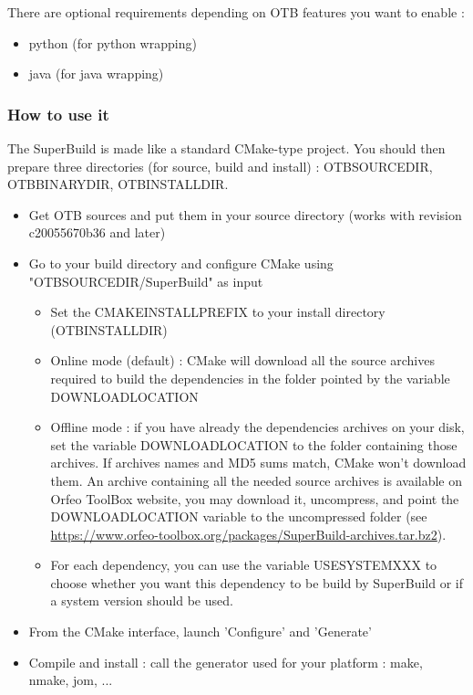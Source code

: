 There are optional requirements depending on OTB features you want to enable :
\begin{itemize}
	\item python (for python wrapping)
    \item java (for java wrapping) 
\end{itemize}

\subsubsection{How to use it}

The SuperBuild is made like a standard CMake-type project. You should then prepare three directories (for source, build and install) :
OTB\textunderscore SOURCE\textunderscore DIR, OTB\textunderscore BINARY\textunderscore DIR, OTB\textunderscore INSTALL\textunderscore DIR.

\begin{itemize}
	\item Get OTB sources and put them in your source directory (works with revision c20055670b36 and later)
    \item Go to your build directory and configure CMake using "OTB\textunderscore SOURCE\textunderscore DIR/SuperBuild" as input
    \begin{itemize}
        \item Set the CMAKE\textunderscore INSTALL\textunderscore PREFIX to your install directory (OTB\textunderscore INSTALL\textunderscore DIR)
        \item Online mode (default) : CMake will download all the source archives required to build the dependencies in the folder pointed by the variable DOWNLOAD\textunderscore LOCATION
        \item Offline mode : if you have already the dependencies archives on your disk, set the variable DOWNLOAD\textunderscore LOCATION to the folder containing those archives. If archives names and MD5 sums match, CMake won't download them. An archive containing all the needed source archives is available on Orfeo ToolBox website, you may download it, uncompress, and point the DOWNLOAD\textunderscore LOCATION variable to the uncompressed folder (see \url{https://www.orfeo-toolbox.org/packages/SuperBuild-archives.tar.bz2}).
        \item For each dependency, you can use the variable USE\textunderscore SYSTEM\textunderscore XXX to choose whether you want this dependency to be build by SuperBuild or if a system version should be used. 
    \end{itemize}
    \item From the CMake interface, launch 'Configure' and 'Generate'
    \item Compile and install : call the generator used for your platform : make, nmake, jom, ... 
\end{itemize}

